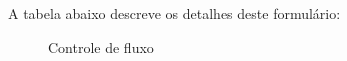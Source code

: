 A tabela abaixo descreve os detalhes deste formulário:


\begin{figure}[h]
 \begin{center}
  \caption{Controle de fluxo}
  \label{fig:cont_fluxo}
 \end{center}
\end{figure}

